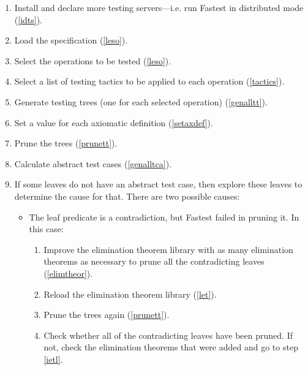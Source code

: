 \begin{enumerate}
\item Install and declare more testing servers---i.e. run Fastest in distributed mode (\ref{idts}).

\item\label{s:loadspec} Load the specification (\ref{leso}).

\item\label{s:selop} Select the operations to be tested (\ref{leso}).

\item\label{s:addtactic} Select a list of testing tactics to be applied to each operation (\ref{tactics}).

\item\label{s:genalltt} Generate testing trees (one for each selected operation) (\ref{genalltt}).

\item\label{s:setaxdef} Set a value for each axiomatic definition (\ref{setaxdef}).

\item\label{s:prunett} Prune the trees (\ref{prunett}).

\item\label{s:genalltca} Calculate abstract test cases (\ref{genalltca}).

\item If some leaves do not have an abstract test case, then explore these leaves to determine the cause for that. There are two possible causes:

\begin{itemize}
\item The leaf predicate is a contradiction, but Fastest failed in pruning it. In this case:

\begin{enumerate}
\item\label{ietl} Improve the elimination theorem library with as many elimination theorems as necessary to prune all the contradicting leaves (\ref{elimtheor}).

\item Reload the elimination theorem library (\ref{let}).

\item Prune the trees again (\ref{prunett}).

\item Check whether all of the contradicting leaves have been pruned. If not, check the elimination theorems that were added and go to step \ref{ietl}.
\end{enumerate}


\end{itemize}
\end{enumerate}
